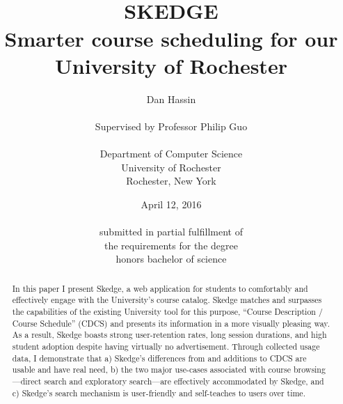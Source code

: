 \documentclass[titlepage]{article}
\title{
\vspace{80pt}\\
\LARGE \bfseries SKEDGE
\\\vspace{10pt}\Large Smarter course scheduling for our\\University of Rochester
}
\author{
	Dan Hassin\\
    \vspace{5pt}\\
    Supervised by Professor Philip Guo\\
    \vspace{5pt}\\
    Department of Computer Science\\
    University of Rochester\\
    Rochester, New York\\
}
\date{April 12, 2016\\
    \vspace{150pt}\\
    submitted in partial fulfillment of\\
    the requirements for the degree\\
    honors bachelor of science\\
}
\begin{document}
\maketitle

\doublespacing



\begin{abstract}

In this paper I present Skedge, a web application for students to comfortably and effectively engage with the University's course catalog. Skedge matches and surpasses the capabilities of the existing University tool for this purpose, ``Course Description / Course Schedule'' (CDCS) and presents its information in a more visually pleasing way. As a result, Skedge boasts strong user-retention rates, long session durations, and high student adoption despite having virtually no advertisement. Through collected usage data, I demonstrate that a) Skedge's differences from and additions to CDCS are usable and have real need, b) the two major use-cases associated with course browsing---direct search and exploratory search---are effectively accommodated by Skedge, and c) Skedge's search mechanism is user-friendly and self-teaches to users over time.

\end{abstract}
\end{document}
